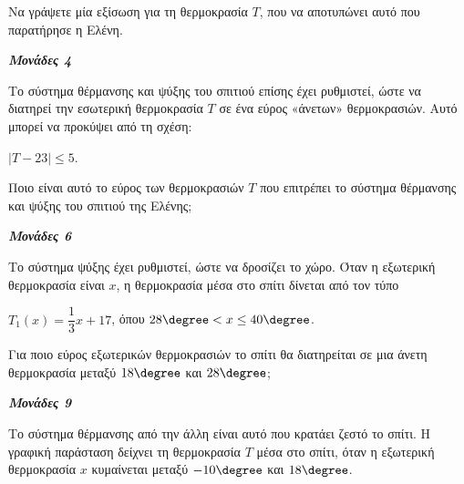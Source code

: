 \documentclass[11pt,a4paper,twoside]{book}
\newcommand{\monades}[1]{
\hspace*{\fill}
\textbf{\textit{\textcolor{maincolor}{Μονάδες #1}}}}
\begin{document}
\begin{alist}
\item Να γράψετε μία εξίσωση για τη θερμοκρασία $T$, που να αποτυπώνει αυτό που παρατήρησε η Ελένη.
\monades{4}
\item Το σύστημα θέρμανσης και ψύξης του σπιτιού επίσης έχει ρυθμιστεί, ώστε να διατηρεί την εσωτερική θερμοκρασία $T$ σε ένα εύρος «άνετων» θερμοκρασιών. Αυτό μπορεί να προκύψει από τη σχέση:

$|T - 23| \leq 5$.

Ποιο είναι αυτό το εύρος των θερμοκρασιών $T$ που επιτρέπει το σύστημα θέρμανσης και ψύξης του σπιτιού της Ελένης;
\monades{6}
\item Το σύστημα ψύξης έχει ρυθμιστεί, ώστε να δροσίζει το χώρο. Όταν η εξωτερική θερμοκρασία είναι $x$, η θερμοκρασία μέσα στο σπίτι δίνεται από τον τύπο

$T_1(x) = \dfrac{1}{3}x + 17$, όπου $28\degree < x \leq 40\degree$.

Για ποιο εύρος εξωτερικών θερμοκρασιών το σπίτι θα διατηρείται σε μια άνετη θερμοκρασία μεταξύ $18\degree$ και $28\degree$;

\begin{marginfigure}

\end{marginfigure}
\monades{9}
\item Το σύστημα θέρμανσης από την άλλη είναι αυτό που κρατάει ζεστό το σπίτι. Η γραφική παράσταση δείχνει τη θερμοκρασία $T$ μέσα στο σπίτι, όταν η εξωτερική θερμοκρασία $x$ κυμαίνεται μεταξύ $-10\degree$ και $18\degree$.


\end{alist}
\end{document}
